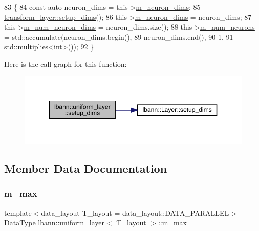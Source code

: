 \begin{DoxyCode}
83                              \{
84     \textcolor{keyword}{const} \textcolor{keyword}{auto} neuron\_dims = this->\hyperlink{classlbann_1_1Layer_abb34bb8031f57a483e2e327a5f229f48}{m\_neuron\_dims};
85     \hyperlink{classlbann_1_1Layer_a90fce1b06c1f2abb480e18cfe08a9746}{transform\_layer::setup\_dims}();
86     this->\hyperlink{classlbann_1_1Layer_abb34bb8031f57a483e2e327a5f229f48}{m\_neuron\_dims} = neuron\_dims;
87     this->\hyperlink{classlbann_1_1Layer_adfd6178d21498c9095cd947ae1eb2d6a}{m\_num\_neuron\_dims} = neuron\_dims.size();
88     this->\hyperlink{classlbann_1_1Layer_a6b5ebc8a7d9329d8a773ed787e7b41d8}{m\_num\_neurons} = std::accumulate(neuron\_dims.begin(),
89                                           neuron\_dims.end(),
90                                           1,
91                                           std::multiplies<int>());
92   \}
\end{DoxyCode}
Here is the call graph for this function\+:\nopagebreak
\begin{figure}[H]
\begin{center}
\leavevmode
\includegraphics[width=350pt]{classlbann_1_1uniform__layer_a60dfb64110369be8f9802c9e010cfbd1_cgraph}
\end{center}
\end{figure}


\subsection{Member Data Documentation}
\mbox{\label{classlbann_1_1uniform__layer_a45004689408c17baf76399f64489c8d4}} 
\subsubsection{\texorpdfstring{m\+\_\+max}{m\_max}}
{\footnotesize\ttfamily template$<$data\+\_\+layout T\+\_\+layout = data\+\_\+layout\+::\+D\+A\+T\+A\+\_\+\+P\+A\+R\+A\+L\+L\+EL$>$ \\
Data\+Type \hyperlink{classlbann_1_1uniform__layer}{lbann\+::uniform\+\_\+layer}$<$ T\+\_\+layout $>$\+::m\+\_\+max\hspace{0.3cm}{\ttfamily [private]}}

